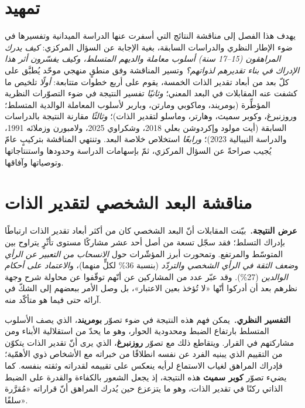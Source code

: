 \documentclass[12pt,oneside]{report}
\begin{document}
\section*{تمهيد}
يهدف هذا الفصل إلى مناقشة النتائج التي أسفرت عنها الدراسة الميدانية وتفسيرها في ضوء الإطار
النظري والدراسات السابقة، بغية الإجابة عن السؤال المركزي: \emph{كيف يدرك المراهقون (15--17 سنة)
أسلوب معاملة والديهم المتسلط، وكيف يفسّرون أثر هذا الإدراك في بناء تقديرهم لذواتهم؟} وتسير
المناقشة وفق منطقٍ منهجي موحّد يُطبَّق على كلّ بعد من أبعاد تقدير الذات الخمسة، يقوم على أربع
خطوات متتابعة: \emph{أولًا} تلخيص ما كشفت عنه المقابلات في البعد المعني؛ \emph{وثانيًا} تفسير
النتيجة في ضوء التصوّرات النظرية المؤطِّرة (بومريند، وماكوبي ومارتن، وباربر لأسلوب المعاملة
الوالدية المتسلط؛ وروزنبرغ، وكوبر سميث، وهارتر، وماسلو لتقدير الذات)؛ \emph{وثالثًا} مقارنة
النتيجة بالدراسات السابقة (أيت مولود وإكردوشن بعلي 2018، وشكراوي 2025، ولامبورن وزملائه 1991،
والدراسة النيبالية 2023)؛ \emph{ورابعًا} استخلاص خلاصة البعد. وتنتهي المناقشة بتركيبٍ عامّ
يُجيب صراحةً عن السؤال المركزي، ثمّ بإسهامات الدراسة وحدودها واستنتاجاتها وتوصياتها وآفاقها.

\section{مناقشة البعد الشخصي لتقدير الذات}
\noindent\textbf{عرض النتيجة.}\ بيّنت المقابلات أنّ البعد الشخصي كان من أكثر أبعاد تقدير الذات
ارتباطًا بإدراك التسلط؛ فقد سجّل تسعة من أصل أحد عشر مشاركًا مستوى تأثّرٍ يتراوح بين المتوسّط
والمرتفع. وتمحورت أبرز المؤشّرات حول \emph{الانسحاب من التعبير عن الرأي} و\emph{ضعف الثقة في
الرأي الشخصي والتردّد} (بنسبة 36\% لكلٍّ منهما)، و\emph{الاعتماد على أحكام الوالدين} (27\%). وقد
عبّر عدد من المشاركين عن أنّهم توقّفوا عن محاولة شرح وجهة نظرهم بعد أن أدركوا أنّها «لا تُؤخذ بعين
الاعتبار»، بل وصل الأمر ببعضهم إلى الشكّ في آرائه حتى فيما هو متأكّد منه.

\noindent\textbf{التفسير النظري.}\ يمكن فهم هذه النتيجة في ضوء تصوّر \textbf{بومريند}، الذي يصف
الأسلوب المتسلط بارتفاع الضبط ومحدودية الحوار، وهو ما يحدّ من استقلالية الأبناء ومن مشاركتهم في
القرار. ويتقاطع ذلك مع تصوّر \textbf{روزنبرغ}، الذي يرى أنّ تقدير الذات يتكوّن من التقييم الذي
يبنيه الفرد عن نفسه انطلاقًا من خبراته مع الأشخاص ذوي الأهمّية؛ فإدراك المراهق لغياب الاستماع
لرأيه ينعكس على تقييمه لقدراته وثقته بنفسه. كما يضيء تصوّر \textbf{كوبر سميث} هذه النتيجة، إذ
يجعل الشعور بالكفاءة والقدرة على الضبط الذاتي ركنًا في تقدير الذات، وهو ما يتزعزع حين يُدرك
المراهق أنّ قراراته «مُقرَّرة سلفًا».
\end{document}
